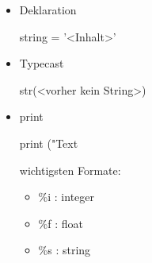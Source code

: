 \documentclass[a4paper,9pt,DIV15,twocolumn]{scrartcl}
\begin{document}
\begin{itemize}
 \item Deklaration
\begin{sagein}
string = '<Inhalt>'
\end{sagein}
\item Typecast
\begin{sagein}
str(<vorher kein String>)
\end{sagein}
\item print
    \begin{sagein}
print ("Text %
    \end{sagein}
    wichtigsten Formate:
    \begin{itemize}
        \item \%i : integer
        \item \%f : float
        \item \%s : string
    \end{itemize}
\end{itemize}
\end{document}
